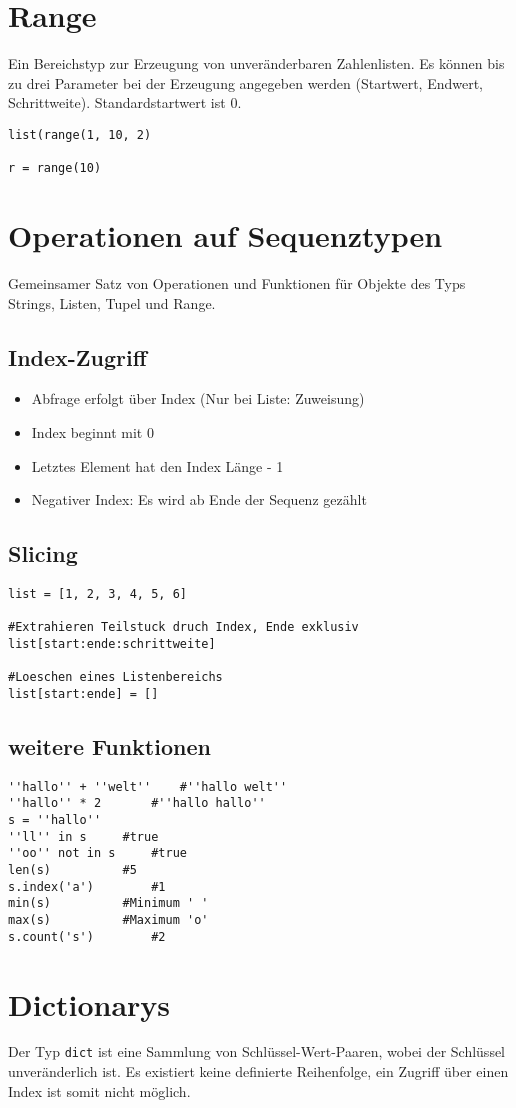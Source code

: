 \section{Range}
Ein Bereichstyp zur Erzeugung von unveränderbaren Zahlenlisten. Es können bis zu drei Parameter bei der Erzeugung angegeben werden (Startwert, Endwert, Schrittweite). Standardstartwert ist 0.
\begin{lstlisting}
list(range(1, 10, 2)

r = range(10)
\end{lstlisting}
\section{Operationen auf Sequenztypen}
Gemeinsamer Satz von Operationen und Funktionen für Objekte des Typs Strings, Listen, Tupel und Range.
\subsection{Index-Zugriff}
\begin{itemize}
\item Abfrage erfolgt über Index (Nur bei Liste: Zuweisung)
\item Index beginnt mit 0
\item Letztes Element hat den Index Länge - 1
\item Negativer Index: Es wird ab Ende der Sequenz gezählt
\end{itemize}
\subsection{Slicing}
\begin{lstlisting}
list = [1, 2, 3, 4, 5, 6]

#Extrahieren Teilstuck druch Index, Ende exklusiv
list[start:ende:schrittweite]

#Loeschen eines Listenbereichs
list[start:ende] = []
\end{lstlisting}
\subsection{weitere Funktionen}
\begin{lstlisting}
''hallo'' + ''welt'' 	#''hallo welt''
''hallo'' * 2		#''hallo hallo''
s = ''hallo''
''ll'' in s		#true
''oo'' not in s		#true
len(s)			#5
s.index('a')		#1
min(s)			#Minimum ' '
max(s)			#Maximum 'o'
s.count('s')		#2
\end{lstlisting}
\section{Dictionarys}
Der Typ \texttt{dict} ist eine Sammlung von Schlüssel-Wert-Paaren, wobei der Schlüssel unveränderlich ist. Es existiert keine definierte Reihenfolge, ein Zugriff über einen Index ist somit nicht möglich.

